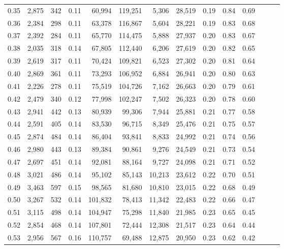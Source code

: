 \begin{tabular}{rrrrrrrrrrrrrr}
0.35 &  2,875 &  342 &  0.11 &   60,994 &  119,251 &   5,306 &  28,519 &  0.19 &  0.84 &      0.69 \\
0.36 &  2,384 &  298 &  0.11 &   63,378 &  116,867 &   5,604 &  28,221 &  0.19 &  0.83 &      0.68 \\
0.37 &  2,392 &  284 &  0.11 &   65,770 &  114,475 &   5,888 &  27,937 &  0.20 &  0.83 &      0.67 \\
0.38 &  2,035 &  318 &  0.14 &   67,805 &  112,440 &   6,206 &  27,619 &  0.20 &  0.82 &      0.65 \\
0.39 &  2,619 &  317 &  0.11 &   70,424 &  109,821 &   6,523 &  27,302 &  0.20 &  0.81 &      0.64 \\
0.40 &  2,869 &  361 &  0.11 &   73,293 &  106,952 &   6,884 &  26,941 &  0.20 &  0.80 &      0.63 \\
0.41 &  2,226 &  278 &  0.11 &   75,519 &  104,726 &   7,162 &  26,663 &  0.20 &  0.79 &      0.61 \\
0.42 &  2,479 &  340 &  0.12 &   77,998 &  102,247 &   7,502 &  26,323 &  0.20 &  0.78 &      0.60 \\
0.43 &  2,941 &  442 &  0.13 &   80,939 &   99,306 &   7,944 &  25,881 &  0.21 &  0.77 &      0.58 \\
0.44 &  2,591 &  405 &  0.14 &   83,530 &   96,715 &   8,349 &  25,476 &  0.21 &  0.75 &      0.57 \\
0.45 &  2,874 &  484 &  0.14 &   86,404 &   93,841 &   8,833 &  24,992 &  0.21 &  0.74 &      0.56 \\
0.46 &  2,980 &  443 &  0.13 &   89,384 &   90,861 &   9,276 &  24,549 &  0.21 &  0.73 &      0.54 \\
0.47 &  2,697 &  451 &  0.14 &   92,081 &   88,164 &   9,727 &  24,098 &  0.21 &  0.71 &      0.52 \\
0.48 &  3,021 &  486 &  0.14 &   95,102 &   85,143 &  10,213 &  23,612 &  0.22 &  0.70 &      0.51 \\
0.49 &  3,463 &  597 &  0.15 &   98,565 &   81,680 &  10,810 &  23,015 &  0.22 &  0.68 &      0.49 \\
0.50 &  3,267 &  532 &  0.14 &  101,832 &   78,413 &  11,342 &  22,483 &  0.22 &  0.66 &      0.47 \\
0.51 &  3,115 &  498 &  0.14 &  104,947 &   75,298 &  11,840 &  21,985 &  0.23 &  0.65 &      0.45 \\
0.52 &  2,854 &  468 &  0.14 &  107,801 &   72,444 &  12,308 &  21,517 &  0.23 &  0.64 &      0.44 \\
0.53 &  2,956 &  567 &  0.16 &  110,757 &   69,488 &  12,875 &  20,950 &  0.23 &  0.62 &      0.42 \\

\end{tabular}
